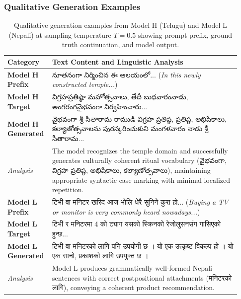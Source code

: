 \documentclass[8pt]{article}
\newcommand{\telugu}[1]{{\telugufont #1}}
\newcommand{\nepali}[1]{{\nepalifont #1}}
\begin{document}
\subsubsection{Qualitative Generation Examples}

\begin{table}[H]
    \centering
    \small
    \begin{tabular}{p{0.15\linewidth}p{0.78\linewidth}}
        \toprule
        \textbf{Category} & \textbf{Text Content and Linguistic Analysis} \\
        \midrule
        \textbf{Model H Prefix} & \telugu{నూతనంగా నిర్మించిన ఈ ఆలయంలో...} (\textit{In this newly constructed temple...}) \\
        \textbf{Model H Target} & \telugu{విగ్రహప్రతిష్ఠా మహోత్సవాలు, తేదీ బుధవారంనాడు, అంగరంగవైభవంగా నిర్వహించారు...} \\
        \textbf{Model H Generated} & \telugu{వైభవంగా శ్రీ సీతారామ రాముడి విగ్రహ ప్రతిష్ఠ, ప్రతిష్ఠ, అభిషేకాలు, కల్యాణోత్సవాలను పురస్కరించుకుని మంగళవారం నాడు శ్రీ సీతారామ...} \\
        \textit{Analysis} & The model recognizes the temple domain and successfully generates culturally coherent ritual vocabulary (\telugu{వైభవంగా, విగ్రహ ప్రతిష్ఠ, అభిషేకాలు, కల్యాణోత్సవాలు}), maintaining appropriate syntactic case marking with minimal localized repetition. \\
        \midrule
        \textbf{Model L Prefix} & \nepali{टिभी वा मनिटर खरिद आज भोलि धेरै सुनिने कुरा हो...} (\textit{Buying a TV or monitor is very commonly heard nowadays...}) \\
        \textbf{Model L Target} & \nepali{4 टिभी र मनिटरमा 4 को ट्याग यसको स्क्रिनको रेजोलुसनसंग गासिएको हुन्छ...} \\
        \textbf{Model L Generated} & \nepali{टिभी वा मनिटरको लागि पनि उपयोगी छ । यो एक उत्कृष्ट विकल्प हो । यो एक सानो, प्रकाशको लागि उपयुक्त छ ।} \\
        \textit{Analysis} & Model L produces grammatically well-formed Nepali sentences with correct postpositional attachments (\nepali{मनिटरको लागि}), conveying a coherent product recommendation. \\
        \bottomrule
    \end{tabular}
    \caption{Qualitative generation examples from Model H (Telugu) and Model L (Nepali) at sampling temperature $T = 0.5$ showing prompt prefix, ground truth continuation, and model output.}
    \label{tab:generation_samples}
\end{table}
\end{document}
